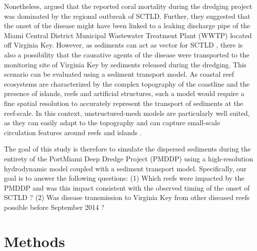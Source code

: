 Nonetheless, \cite{gintert2019regional} argued that the reported coral mortality during the dredging project was dominated by the regional outbreak of SCTLD. Further, they suggested that the onset of the disease might have been linked to a leaking discharge pipe of the Miami Central District Municipal Wastewater Treatment Plant (WWTP) located off Virginia Key. However, as sediments can act as vector for SCTLD \citep{studivan2022reef}, there is also a possibility that the causative agents of the disease were transported to the monitoring site of Virginia Key by sediments released during the dredging. This scenario can be evaluated using a sediment transport model. As coastal reef ecosystems are characterized by the complex topography of the coastline and the presence of islands, reefs and artificial structures, such a model would require a fine spatial resolution to accurately represent the transport of sediments at the reef-scale. In this context, unstructured-mesh models are particularly well suited, as they can easily adapt to the topography \citep{fringer2019future} and can capture small-scale circulation features around reefs and islands \citep{lambrechts2008multi}.

The goal of this study is therefore to simulate the dispersed sediments during the entirety of the PortMiami Deep Dredge Project (PMDDP) using a high-resolution hydrodynamic model coupled with a sediment transport model. Specifically, our goal is to answer the following questions: (1) Which reefs were impacted by the PMDDP and was this impact consistent with the observed timing of the onset of SCTLD ?  (2) Was disease transmission to Virginia Key from other diseased reefs possible before September 2014 ? 

\section{Methods}


